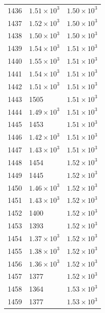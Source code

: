 \begin{table}[H]
\begin{tabular}{lll}
1436 & $\displaystyle 1.51 \times 10^{3}$ & $\displaystyle 1.50 \times 10^{3}$ \\
1437 & $\displaystyle 1.52 \times 10^{3}$ & $\displaystyle 1.50 \times 10^{3}$ \\
1438 & $\displaystyle 1.50 \times 10^{3}$ & $\displaystyle 1.50 \times 10^{3}$ \\
1439 & $\displaystyle 1.54 \times 10^{3}$ & $\displaystyle 1.51 \times 10^{3}$ \\
1440 & $\displaystyle 1.55 \times 10^{3}$ & $\displaystyle 1.51 \times 10^{3}$ \\
1441 & $\displaystyle 1.54 \times 10^{3}$ & $\displaystyle 1.51 \times 10^{3}$ \\
1442 & $\displaystyle 1.51 \times 10^{3}$ & $\displaystyle 1.51 \times 10^{3}$ \\
1443 & 1505 & $\displaystyle 1.51 \times 10^{3}$ \\
1444 & $\displaystyle 1.49 \times 10^{3}$ & $\displaystyle 1.51 \times 10^{3}$ \\
1445 & 1453 & $\displaystyle 1.51 \times 10^{3}$ \\
1446 & $\displaystyle 1.42 \times 10^{3}$ & $\displaystyle 1.51 \times 10^{3}$ \\
1447 & $\displaystyle 1.43 \times 10^{3}$ & $\displaystyle 1.51 \times 10^{3}$ \\
1448 & 1454 & $\displaystyle 1.52 \times 10^{3}$ \\
1449 & 1445 & $\displaystyle 1.52 \times 10^{3}$ \\
1450 & $\displaystyle 1.46 \times 10^{3}$ & $\displaystyle 1.52 \times 10^{3}$ \\
1451 & $\displaystyle 1.43 \times 10^{3}$ & $\displaystyle 1.52 \times 10^{3}$ \\
1452 & 1400 & $\displaystyle 1.52 \times 10^{3}$ \\
1453 & 1393 & $\displaystyle 1.52 \times 10^{3}$ \\
1454 & $\displaystyle 1.37 \times 10^{3}$ & $\displaystyle 1.52 \times 10^{3}$ \\
1455 & $\displaystyle 1.38 \times 10^{3}$ & $\displaystyle 1.52 \times 10^{3}$ \\
1456 & $\displaystyle 1.36 \times 10^{3}$ & $\displaystyle 1.52 \times 10^{3}$ \\
1457 & 1377 & $\displaystyle 1.52 \times 10^{3}$ \\
1458 & 1364 & $\displaystyle 1.53 \times 10^{3}$ \\
1459 & 1377 & $\displaystyle 1.53 \times 10^{3}$ \\

\end{tabular}
\end{table}

